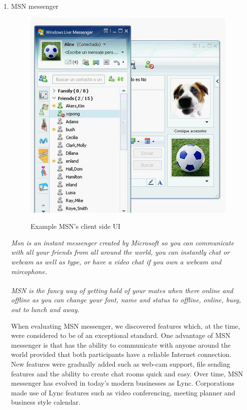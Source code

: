 \documentclass{article}
\begin{document}
	\begin{enumerate}
		\item MSN messenger
	
		\begin{figure}[h]
		\centering
		\includegraphics[scale=0.4]{msn-messenger-3.jpg}
		\cite{msnimage}
		\caption{Example MSN's client side UI}
		\end{figure}
		
	\textit{Msn is an instant messenger created by Microsoft so you can communicate with all your friends from all around the world, you can instantly chat or webcam as well as type, or have a video chat if you own a webcam and mircophone.\\ \\MSN is the fancy way of getting hold of your mates when there online and offline as you can change your font, name and status to offline, online, busy, out to lunch and away.}\par \cite{msndesc}

	When evaluating MSN messenger, we discovered features which, at the time, were considered to be of an exceptional standard. One advantage of MSN messenger is that has the ability to communicate with anyone around the world provided that both participants have a reliable Internet connection. New features were gradually added such as web-cam support, file sending features and the ability to create chat rooms quick and easy. Over time, MSN messenger has evolved in today's modern businesses as Lync. Corporations made use of Lync features such as video conferencing, meeting planner and business style calendar. \par
	

\end{enumerate}
\end{document}

